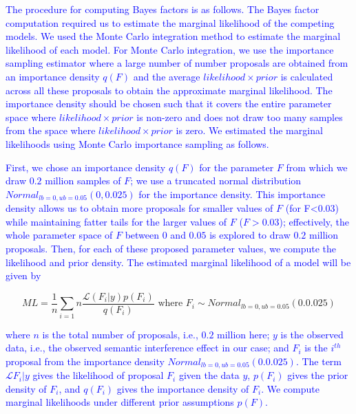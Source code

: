 \documentclass[a4paper, man, floatsintext]{apa7}
\begin{document}
{\textcolor{blue}{The procedure for computing Bayes factors is as follows. The Bayes factor computation required us to estimate the marginal likelihood of the competing models. We used the Monte Carlo integration method to estimate the marginal likelihood of each model. For Monte Carlo integration, we use the importance sampling estimator where a large number of number proposals are obtained from an importance density $q(F)$ and the average $likelihood \times prior$ is calculated across all these proposals to obtain the approximate marginal likelihood. The importance density should be chosen such that it covers the entire parameter space where $likelihood \times prior$ is non-zero and does not draw too many samples from the space where $likelihood \times prior$ is zero. We estimated the marginal likelihoods using Monte Carlo importance sampling as follows. }

\textcolor{blue}{First, we chose an importance density $q(F)$ for the parameter $F$ from which we draw $0.2$ million samples of $F$; we use a truncated normal distribution $Normal_{lb=0,ub=0.05}(0,0.025)$ for the importance density. This importance density allows us to obtain more proposals for smaller values of $F$ (for F<0.03) while maintaining fatter tails for the larger values of $F$ ($F>0.03$); effectively, the whole parameter space of $F$ between $0$ and $0.05$ is explored to draw $0.2$ million proposals. Then, for each of these proposed parameter values, we compute the likelihood and prior density. The estimated marginal likelihood of a model will be given by}

\begin{equation}
ML = \frac{1}{n} \sum_{i=1}{n} \frac{\mathcal{L}(F_i|y) p(F_i)}{q(F_i)} \text{ where } F_i \sim Normal_{lb=0,ub=0.05}(0.0.025) 
\end{equation}

\noindent \textcolor{blue}{where $n$ is the total number of proposals, i.e., $0.2$ million here; $y$ is the observed data, i.e., the observed semantic interference effect in our case; and $F_i$ is the $i^{th}$ proposal from the importance density $Normal_{lb=0,ub=0.05}(0.0.025) $. 
The term $\mathcal{L}{F_i|y}$ gives the likelihood of proposal $F_i$ given the data $y$, $p(F_i)$ gives the prior density of $F_i$, and $q(F_i)$ gives the importance density of $F_i$. We compute marginal likelihoods under different prior assumptions $p(F)$.}

}
\end{document}
